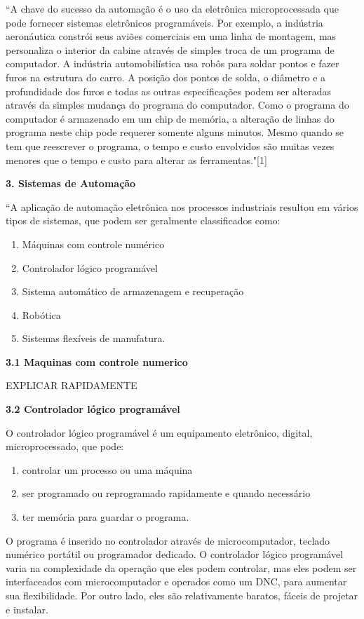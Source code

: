 \documentclass[a4paper, 12pt]{article}
\begin{document}
``A chave do sucesso da automação é o uso da eletrônica microprocessada que
pode fornecer sistemas eletrônicos programáveis. Por exemplo, a indústria
aeronáutica constrói seus aviões comerciais em uma linha de montagem,
mas personaliza o interior da cabine através de simples troca de um programa
de computador. A indústria automobilística usa robôs para soldar pontos e 
fazer furos na estrutura do carro. A posição dos pontos de solda, o diâmetro
e a profundidade dos furos e todas as outras especificações podem ser alteradas
através da simples mudança do programa do computador. Como o programa do 
computador é armazenado em um chip de memória, a alteração de linhas do programa
neste chip pode requerer somente alguns minutos. Mesmo quando se tem que 
reescrever o programa, o tempo e custo envolvidos são muitas vezes menores que o
tempo e custo para alterar as ferramentas."[1]

\textbf{3. Sistemas de Automação}

``A aplicação de automação eletrônica nos processos industriais resultou em
vários tipos de sistemas, que podem ser geralmente classificados como:
\begin{enumerate}
	\item Máquinas com controle numérico
	\item Controlador lógico programável
	\item Sistema automático de armazenagem e recuperação
	\item Robótica
	\item Sistemas flexíveis de manufatura.
\end{enumerate}

\textbf{3.1 Maquinas com controle numerico}

EXPLICAR RAPIDAMENTE

\textbf{3.2 Controlador lógico programável}

O controlador lógico programável é um equipamento eletrônico, digital, 
microprocessado, que pode:
\begin{enumerate}
	\item controlar um processo ou uma máquina
	\item ser programado ou reprogramado rapidamente e quando necessário
	\item ter memória para guardar o programa.
\end{enumerate}
O programa é inserido no controlador através de microcomputador, teclado
numérico portátil ou programador dedicado. O controlador lógico programável
varia na complexidade da operação que eles podem controlar, mas eles podem ser
interfaceados com microcomputador e operados como um DNC, para aumentar
sua flexibilidade. Por outro lado, eles são relativamente baratos, fáceis 
de projetar e instalar.
\end{document}
